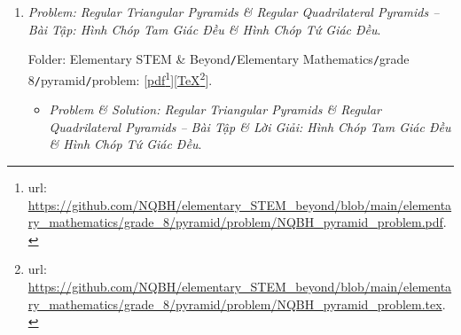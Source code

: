 \documentclass[12pt]{article}
\begin{document}
\begin{enumerate}
	Folder: {\sf Elementary STEM \& Beyond{\tt/}Elementary Mathematics{\tt/}grade 8{\tt/}1st-order function{\tt/}problem}: [\href{https://github.com/NQBH/elementary_STEM_beyond/blob/main/elementary_mathematics/grade_8/1st_order_function/problem/NQBH_1st_order_function_problem.pdf}{pdf}\footnote{{\sc url}: \url{https://github.com/NQBH/elementary_STEM_beyond/blob/main/elementary_mathematics/grade_8/1st_order_function/problem/NQBH_1st_order_function_problem.pdf}.}][\href{https://github.com/NQBH/elementary_STEM_beyond/blob/main/elementary_mathematics/grade_8/1st_order_function/problem/NQBH_1st_order_function_problem.tex}{\TeX}\footnote{{\sc url}: \url{https://github.com/NQBH/elementary_STEM_beyond/blob/main/elementary_mathematics/grade_8/1st_order_function/problem/NQBH_1st_order_function_problem.tex}.}].
	\begin{itemize}
		\item {\it Problem \& Solution: 1st-Order Function -- Bài Tập \& Lời Giải: Hàm Số Bậc Nhất $y = ax + b$, $a,b\in\mathbb{R}$, $a\ne0$}.
		
		Folder: {\sf Elementary STEM \& Beyond{\tt/}Elementary Mathematics{\tt/}grade 8{\tt/}1st-order function{\tt/}solution}: [\href{https://github.com/NQBH/elementary_STEM_beyond/blob/main/elementary_mathematics/grade_8/1st_order_function/solution/NQBH_1st_order_function_solution.pdf}{pdf}\footnote{{\sc url}: \url{https://github.com/NQBH/elementary_STEM_beyond/blob/main/elementary_mathematics/grade_8/1st_order_function/solution/NQBH_1st_order_function_solution.pdf}.}][\href{https://github.com/NQBH/elementary_STEM_beyond/blob/main/elementary_mathematics/grade_8/1st_order_function/solution/NQBH_1st_order_function_solution.tex}{\TeX}\footnote{{\sc url}: \url{https://github.com/NQBH/elementary_STEM_beyond/blob/main/elementary_mathematics/grade_8/1st_order_function/solution/NQBH_1st_order_function_solution.tex}.}].
	\end{itemize}
	\item {\it Problem: Regular Triangular Pyramids {\it\&} Regular Quadrilateral Pyramids -- Bài Tập: Hình Chóp Tam Giác Đều {\it\&} Hình Chóp Tứ Giác Đều}.
	
	Folder: {\sf Elementary STEM \& Beyond{\tt/}Elementary Mathematics{\tt/}grade 8{\tt/}pyramid{\tt/}problem}: [\href{https://github.com/NQBH/elementary_STEM_beyond/blob/main/elementary_mathematics/grade_8/pyramid/problem/NQBH_pyramid_problem.pdf}{pdf}\footnote{{\sc url}: \url{https://github.com/NQBH/elementary_STEM_beyond/blob/main/elementary_mathematics/grade_8/pyramid/problem/NQBH_pyramid_problem.pdf}.}][\href{https://github.com/NQBH/elementary_STEM_beyond/blob/main/elementary_mathematics/grade_8/pyramid/problem/NQBH_pyramid_problem.tex}{\TeX}\footnote{{\sc url}: \url{https://github.com/NQBH/elementary_STEM_beyond/blob/main/elementary_mathematics/grade_8/pyramid/problem/NQBH_pyramid_problem.tex}.}].
	\begin{itemize}
		\item {\it Problem \& Solution: Regular Triangular Pyramids \& Regular Quadrilateral Pyramids -- Bài Tập \& Lời Giải: Hình Chóp Tam Giác Đều \& Hình Chóp Tứ Giác Đều}.
		

\end{itemize}
\end{enumerate}
\end{document}
